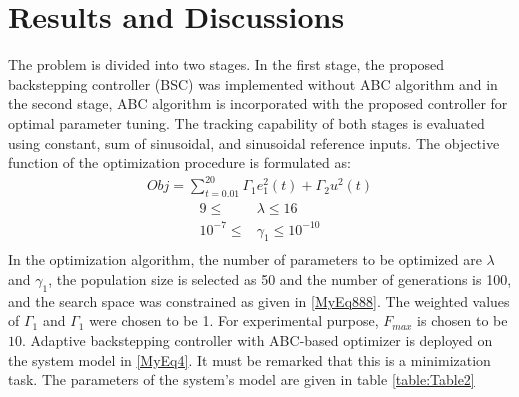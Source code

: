\documentclass{article} %
\begin{document}
\section{Results and Discussions}
The problem is divided into two stages. In the first stage, the proposed backstepping controller (BSC) was implemented without ABC algorithm and in the second stage, ABC algorithm is incorporated with the proposed controller for optimal parameter tuning. The tracking capability of both stages is evaluated using constant, sum of sinusoidal, and sinusoidal reference inputs. The objective function of the optimization procedure is formulated as:
\begin{equation} \label{MyEq888}
  \begin{split}
  Obj= \sum^{20}_{t=0.01}\Gamma_1 e_1^2(t)+\Gamma_2 u^2(t)
  \end{split}
\end{equation}
\begin{equation*} \label{MyEq8888}
  \begin{aligned}
   9 \leq & \lambda \leq 16\\
   10^{-7} \leq & \gamma_1 \leq 10^{-10}\\
  \end{aligned}
\end{equation*}
In the optimization algorithm, the number of parameters to be optimized are $\lambda$ and $\gamma_1$, the population size is selected as 50 and the number of generations is 100, and the search space was constrained as given in \eqref{MyEq888}. The weighted values of $\Gamma_1$ and $\Gamma_1$ were chosen to be 1. For experimental purpose, $F_{max}$ is chosen to be $10$. Adaptive backstepping controller with ABC-based optimizer is deployed on the system model in \eqref{MyEq4}. It must be remarked that this is a minimization task. The parameters of the system's model are given in table {\ref{table:Table2}}\\
\end{document}
